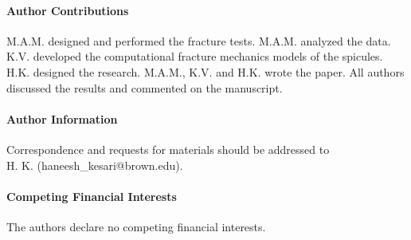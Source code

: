 \documentclass[12pt,onecolumn]{article}
\begin{document}
\begin{bibunit}



\paragraph{Author Contributions} M.A.M. designed and performed the fracture tests. M.A.M. analyzed the data. K.V. developed the computational fracture mechanics models of the spicules. H.K. designed the research. M.A.M., K.V. and H.K. wrote the paper. All authors discussed the results and commented on the manuscript.

\paragraph{Author Information} Correspondence and requests for materials should be addressed to \\ H. K. (haneesh\_kesari@brown.edu).

\paragraph{Competing Financial Interests} The authors declare no competing financial interests.

\putbib[refs]
% 


\end{bibunit}



\end{document}
